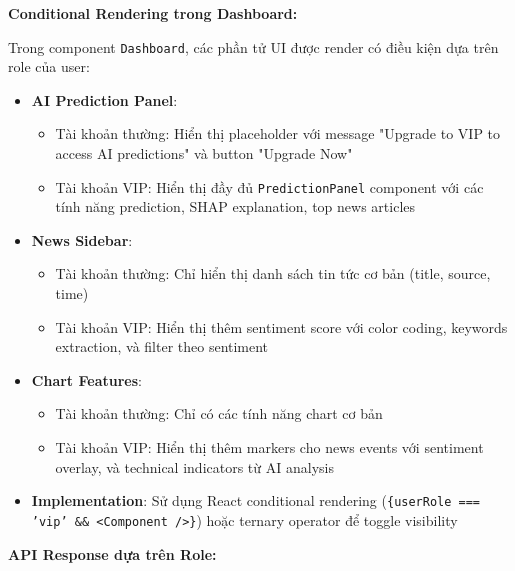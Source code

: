 \noindent\textbf{Conditional Rendering trong Dashboard:}

Trong component \texttt{Dashboard}, các phần tử UI được render có điều kiện dựa trên role của user:
\begin{itemize}
    \item \textbf{AI Prediction Panel}: 
    \begin{itemize}
        \item Tài khoản thường: Hiển thị placeholder với message "Upgrade to VIP to access AI predictions" và button "Upgrade Now"
        \item Tài khoản VIP: Hiển thị đầy đủ \texttt{PredictionPanel} component với các tính năng prediction, SHAP explanation, top news articles
    \end{itemize}
    \item \textbf{News Sidebar}:
    \begin{itemize}
        \item Tài khoản thường: Chỉ hiển thị danh sách tin tức cơ bản (title, source, time)
        \item Tài khoản VIP: Hiển thị thêm sentiment score với color coding, keywords extraction, và filter theo sentiment
    \end{itemize}
    \item \textbf{Chart Features}:
    \begin{itemize}
        \item Tài khoản thường: Chỉ có các tính năng chart cơ bản
        \item Tài khoản VIP: Hiển thị thêm markers cho news events với sentiment overlay, và technical indicators từ AI analysis
    \end{itemize}
    \item \textbf{Implementation}: Sử dụng React conditional rendering (\texttt{\{userRole === 'vip' \&\& <Component />\}}) hoặc ternary operator để toggle visibility
\end{itemize}

\noindent\textbf{API Response dựa trên Role:}

